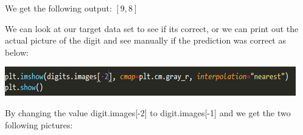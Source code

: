 \documentclass[a4paper,12pt]{report}
\begin{document}
We get the following output: $[9, 8]$

We can look at our target data set to see if its correct, or we can print out the actual picture of the digit and see manually if the prediction was correct as below:

\begin{center}
    \captionsetup{type=figure}
    \includegraphics[width=.9\linewidth]{media/pltImShow.png}
\end{center}

By changing the value digit.images[-2] to digit.images[-1] and we get the two following pictures:
\end{document}
